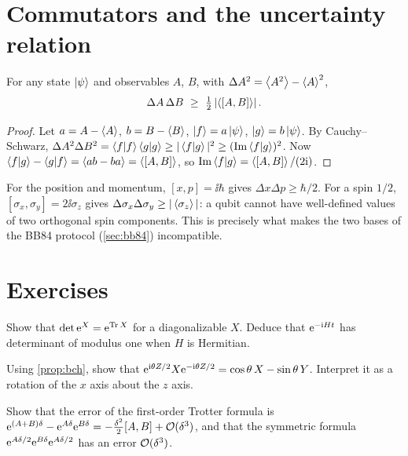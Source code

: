\section{Commutators and the uncertainty relation}
\begin{theorem}
For any state $\left|\psi\right\rangle$ and observables $A$, $B$, with $\Delta A^2=\left\langle A^2\right\rangle-\left\langle A\right\rangle^2$,
\begin{equation}
  \Delta A\,\Delta B\ \ge\ \tfrac12\abs{\expval{[A,B]}}.
\end{equation}
\end{theorem}
\begin{proof}
Let $a=A-\left\langle A\right\rangle$, $b=B-\left\langle B\right\rangle$, $\left|f\right\rangle=a\left|\psi\right\rangle$, $\left|g\right\rangle=b\left|\psi\right\rangle$. By Cauchy--Schwarz,
$\Delta A^2\Delta B^2=\left\langle f\middle|f\right\rangle\left\langle g\middle|g\right\rangle\ge|\left\langle f\middle|g\right\rangle|^2\ge(\operatorname{Im}\left\langle f\middle|g\right\rangle)^2$. Now
$\left\langle f\middle|g\right\rangle-\left\langle g\middle|f\right\rangle=\left\langle ab-ba\right\rangle=\left\langle[A,B]\right\rangle$, so $\operatorname{Im}\left\langle f\middle|g\right\rangle=\left\langle[A,B]\right\rangle/(2\mathrm i)$.
\end{proof}
For the position and momentum, $[x,p]=\ii\hbar$ gives $\Delta x\Delta p\ge\hbar/2$. For a spin $1/2$, $[\sigma_x,\sigma_y]=2\ii\sigma_z$ gives
$\Delta\sigma_x\Delta\sigma_y\ge|\left\langle\sigma_z\right\rangle|$: a qubit cannot have well-defined values of two orthogonal spin components.
This is precisely what makes the two bases of the BB84 protocol (\cref{sec:bb84}) incompatible.

\section{Exercises}
\begin{exercise}
Show that $\det\mathrm e^X=\mathrm e^{\operatorname{Tr} X}$ for a diagonalizable $X$. Deduce that $\mathrm e^{-\mathrm i Ht}$ has determinant of modulus one when $H$ is Hermitian.
\end{exercise}
\begin{exercise}
Using \cref{prop:bch}, show that $\mathrm e^{\mathrm i\theta Z/2}X\mathrm e^{-\mathrm i\theta Z/2}=\cos\theta\,X-\sin\theta\,Y$. Interpret it as a rotation of the
$x$ axis about the $z$ axis.
\end{exercise}
\begin{exercise}
Show that the error of the first-order Trotter formula is $\mathrm e^{(A+B)\delta}-\mathrm e^{A\delta}\mathrm e^{B\delta}=-\tfrac{\delta^2}{2}[A,B]+\mathcal O(\delta^3)$,
and that the symmetric formula $\mathrm e^{A\delta/2}\mathrm e^{B\delta}\mathrm e^{A\delta/2}$ has an error $\mathcal O(\delta^3)$.
\end{exercise}
